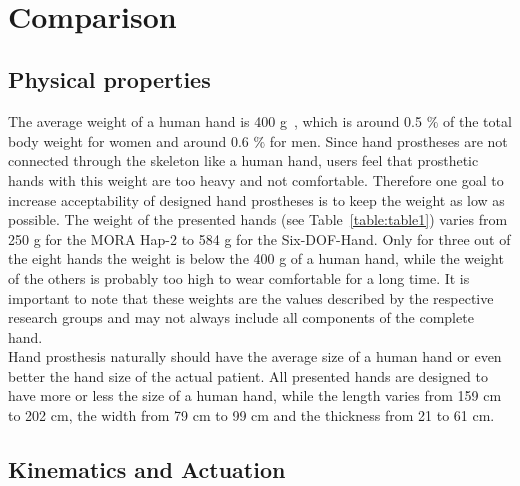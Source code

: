 \documentclass[a4paper, 10pt, conference]{ieeeconf}      %
\begin{document}
\newpage~\newpage

\section{Comparison}

\subsection{Physical properties}

The average weight of a human hand is 400 g~\cite{humanbody}, which is around 0.5 $\%$ of the total body weight for women and around 0.6 $\%$ for men. Since hand prostheses are not connected through the skeleton like a human hand, users feel that prosthetic hands with this weight are too heavy and not comfortable. Therefore one goal to increase acceptability of designed hand prostheses is to keep the weight as low as possible. The weight of the presented hands (see Table~\ref{table:table1}) varies from 250 g for the MORA Hap-2 to 584 g for the Six-DOF-Hand. Only for three out of the eight hands the weight is below the 400 g of a human hand, while the weight of the others is probably too high to wear comfortable for a long time. It is important to note that these weights are the values described by the respective research groups and may not always include all components of the complete hand.\\
Hand prosthesis naturally should have the average size of a human hand or even better the hand size of the actual patient. All presented hands are designed to have more or less the size of a human hand, while the length varies from 159 cm to 202 cm, the width from 79 cm to 99 cm and the thickness from 21 to 61 cm.

\subsection{Kinematics and Actuation}
\end{document}
